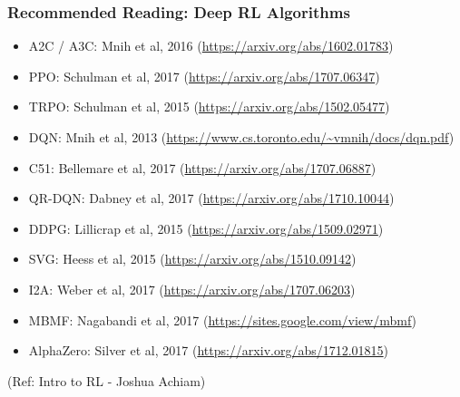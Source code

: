 \begin{frame}[fragile]\frametitle{Recommended Reading: Deep RL Algorithms}

\begin{itemize}
\item A2C / A3C: Mnih et al, 2016 (\url{https://arxiv.org/abs/1602.01783})
\item PPO: Schulman et al, 2017 (\url{https://arxiv.org/abs/1707.06347})
\item TRPO: Schulman et al, 2015 (\url{https://arxiv.org/abs/1502.05477})
\item DQN: Mnih et al, 2013 (\url{https://www.cs.toronto.edu/~vmnih/docs/dqn.pdf})
\item C51: Bellemare et al, 2017 (\url{https://arxiv.org/abs/1707.06887})
\item QR-DQN: Dabney et al, 2017 (\url{https://arxiv.org/abs/1710.10044})
\item DDPG: Lillicrap et al, 2015 (\url{https://arxiv.org/abs/1509.02971})
\item SVG: Heess et al, 2015 (\url{https://arxiv.org/abs/1510.09142})
\item I2A: Weber et al, 2017 (\url{https://arxiv.org/abs/1707.06203})
\item MBMF: Nagabandi et al, 2017 (\url{https://sites.google.com/view/mbmf})
\item AlphaZero: Silver et al, 2017 (\url{https://arxiv.org/abs/1712.01815})
\end{itemize}
{\tiny (Ref: Intro to RL - Joshua Achiam)}


\end{frame}

